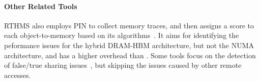 



\paragraph{Other Related Tools}
RTHMS also employs PIN to collect memory traces, and then assigns a score to each object-to-memory based on its algorithms~\cite{RTHMS}. It aims for identifying the peformance issues for the hybrid DRAM-HBM architecture, but not the NUMA architecture, and has a higher overhead than \NP{}. Some tools focus on the detection of false/true sharing issues~\cite{Predator, Cheetah, DBLP:conf/ppopp/ChabbiWL18, helm2019perfmemplus}, but skipping the issues caused by other remote accesses. 





